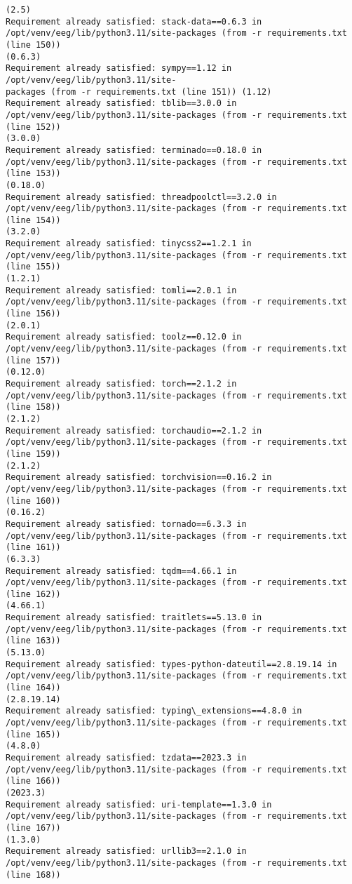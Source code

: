 \documentclass[11pt]{article}
\begin{document}
\begin{Verbatim}[commandchars=\\\{\}]
(2.5)
Requirement already satisfied: stack-data==0.6.3 in
/opt/venv/eeg/lib/python3.11/site-packages (from -r requirements.txt (line 150))
(0.6.3)
Requirement already satisfied: sympy==1.12 in /opt/venv/eeg/lib/python3.11/site-
packages (from -r requirements.txt (line 151)) (1.12)
Requirement already satisfied: tblib==3.0.0 in
/opt/venv/eeg/lib/python3.11/site-packages (from -r requirements.txt (line 152))
(3.0.0)
Requirement already satisfied: terminado==0.18.0 in
/opt/venv/eeg/lib/python3.11/site-packages (from -r requirements.txt (line 153))
(0.18.0)
Requirement already satisfied: threadpoolctl==3.2.0 in
/opt/venv/eeg/lib/python3.11/site-packages (from -r requirements.txt (line 154))
(3.2.0)
Requirement already satisfied: tinycss2==1.2.1 in
/opt/venv/eeg/lib/python3.11/site-packages (from -r requirements.txt (line 155))
(1.2.1)
Requirement already satisfied: tomli==2.0.1 in
/opt/venv/eeg/lib/python3.11/site-packages (from -r requirements.txt (line 156))
(2.0.1)
Requirement already satisfied: toolz==0.12.0 in
/opt/venv/eeg/lib/python3.11/site-packages (from -r requirements.txt (line 157))
(0.12.0)
Requirement already satisfied: torch==2.1.2 in
/opt/venv/eeg/lib/python3.11/site-packages (from -r requirements.txt (line 158))
(2.1.2)
Requirement already satisfied: torchaudio==2.1.2 in
/opt/venv/eeg/lib/python3.11/site-packages (from -r requirements.txt (line 159))
(2.1.2)
Requirement already satisfied: torchvision==0.16.2 in
/opt/venv/eeg/lib/python3.11/site-packages (from -r requirements.txt (line 160))
(0.16.2)
Requirement already satisfied: tornado==6.3.3 in
/opt/venv/eeg/lib/python3.11/site-packages (from -r requirements.txt (line 161))
(6.3.3)
Requirement already satisfied: tqdm==4.66.1 in
/opt/venv/eeg/lib/python3.11/site-packages (from -r requirements.txt (line 162))
(4.66.1)
Requirement already satisfied: traitlets==5.13.0 in
/opt/venv/eeg/lib/python3.11/site-packages (from -r requirements.txt (line 163))
(5.13.0)
Requirement already satisfied: types-python-dateutil==2.8.19.14 in
/opt/venv/eeg/lib/python3.11/site-packages (from -r requirements.txt (line 164))
(2.8.19.14)
Requirement already satisfied: typing\_extensions==4.8.0 in
/opt/venv/eeg/lib/python3.11/site-packages (from -r requirements.txt (line 165))
(4.8.0)
Requirement already satisfied: tzdata==2023.3 in
/opt/venv/eeg/lib/python3.11/site-packages (from -r requirements.txt (line 166))
(2023.3)
Requirement already satisfied: uri-template==1.3.0 in
/opt/venv/eeg/lib/python3.11/site-packages (from -r requirements.txt (line 167))
(1.3.0)
Requirement already satisfied: urllib3==2.1.0 in
/opt/venv/eeg/lib/python3.11/site-packages (from -r requirements.txt (line 168))

\end{Verbatim}
\end{document}
